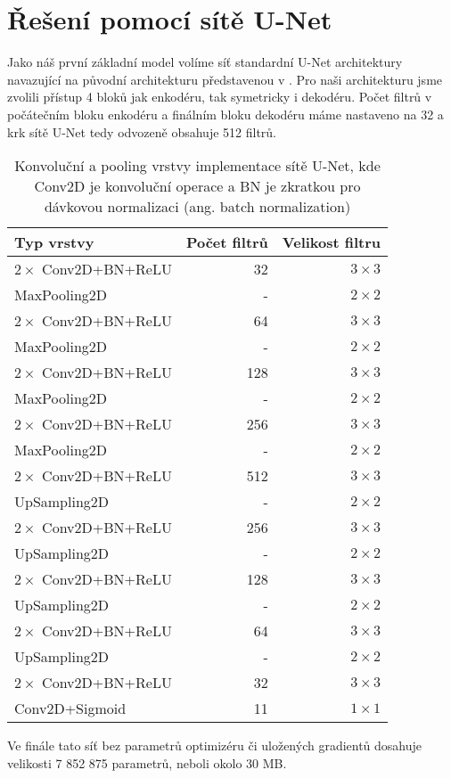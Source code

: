 \section{Řešení pomocí sítě U-Net}
\label{sec:Chapter43}
Jako náš první základní model volíme síť standardní U-Net architektury navazující na původní architekturu představenou v \cite{unet}. Pro naši architekturu jsme zvolili přístup 4 bloků jak enkodéru, tak symetricky i dekodéru. Počet filtrů v počátečním bloku enkodéru a finálním bloku dekodéru máme nastaveno na 32 a krk sítě U-Net tedy odvozeně obsahuje 512 filtrů. 

\begin{table}[ht]
\centering
\begin{tabular}{@{}lrr@{}}
\toprule
Typ vrstvy & Počet filtrů & Velikost filtru \\ \midrule
$2\times$ Conv2D+BN+ReLU & 32 & $3 \times 3$ \\
MaxPooling2D & - & $2 \times 2$ \\
$2\times$ Conv2D+BN+ReLU & 64 & $3 \times 3$ \\
MaxPooling2D & - & $2 \times 2$ \\
$2\times$ Conv2D+BN+ReLU & 128 & $3 \times 3$ \\
MaxPooling2D & - & $2 \times 2$ \\
$2\times$ Conv2D+BN+ReLU & 256 & $3 \times 3$ \\
MaxPooling2D & - & $2 \times 2$ \\
$2\times$ Conv2D+BN+ReLU & 512 & $3 \times 3$ \\
UpSampling2D & - & $2 \times 2$ \\
$2\times$ Conv2D+BN+ReLU & 256 & $3 \times 3$ \\
UpSampling2D & - & $2 \times 2$ \\
$2\times$ Conv2D+BN+ReLU & 128 & $3 \times 3$ \\
UpSampling2D & - & $2 \times 2$ \\
$2\times$ Conv2D+BN+ReLU & 64 & $3 \times 3$ \\
UpSampling2D & - & $2 \times 2$ \\
$2\times$ Conv2D+BN+ReLU & 32 & $3 \times 3$ \\
Conv2D+Sigmoid & 11 & $1 \times 1$ \\
\bottomrule
\end{tabular}
\caption[Konvoluční a pooling vrstvy implementace sítě U-Net]{Konvoluční a pooling vrstvy implementace sítě U-Net, kde Conv2D je konvoluční operace a BN je zkratkou pro dávkovou normalizaci (ang. batch normalization) }
\label{fig:model_architecture}
\end{table}

Ve finále tato síť bez parametrů optimizéru či uložených gradientů dosahuje velikosti 7 852 875 parametrů, neboli okolo 30 MB.


\endinput